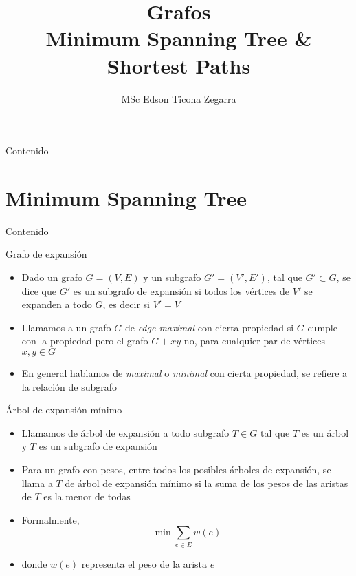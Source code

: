 \documentclass[]{beamer}
\title{Grafos\\Minimum Spanning Tree \& Shortest Paths}
\author{MSc Edson Ticona Zegarra}
\institute{Taller avanzado 2025}
\date{}
\begin{document}
\maketitle

\begin{frame}{Contenido}
\tableofcontents
\end{frame}

\section{Minimum Spanning Tree}
\begin{frame}{Contenido}
\tableofcontents[currentsection]
\end{frame}

\begin{frame}{Grafo de expansi\'on}
  \begin{itemize}
    \item Dado un grafo $G=(V,E)$ y un subgrafo $G'=(V',E')$, tal que $G' \subset G$, se dice que $G'$ es un subgrafo de expansi\'on si todos los v\'ertices de $V'$ se expanden a todo $G$, es decir si $V'=V$
      \pause
    \item Llamamos a un grafo $G$ de \textit{edge-maximal} con cierta propiedad si $G$ cumple con la propiedad pero el grafo $G+xy$ no, para cualquier par de v\'ertices $x, y \in G$
      \pause
    \item En general hablamos de \textit{maximal} o \textit{minimal} con cierta propiedad, se refiere a la relaci\'on de subgrafo
  \end{itemize}
\end{frame}

\begin{frame}{\'Arbol de expansi\'on m\'inimo}
  \begin{itemize}
    \item Llamamos de \'arbol de expansi\'on a todo subgrafo $T \in G$ tal que $T$ es un \'arbol y $T$ es un subgrafo de expansi\'on
      \pause
    \item Para un grafo con pesos, entre todos los posibles \'arboles de expansi\'on, se llama a $T$ de \'arbol de expansi\'on m\'inimo si la suma de los pesos de las aristas de $T$ es la menor de todas
      \pause
    \item Formalmente, $$\min \sum_{e \in E} w(e)$$
      \pause
    \item donde $w(e)$ representa el peso de la arista $e$
  \end{itemize}
\end{frame}
\end{document}

